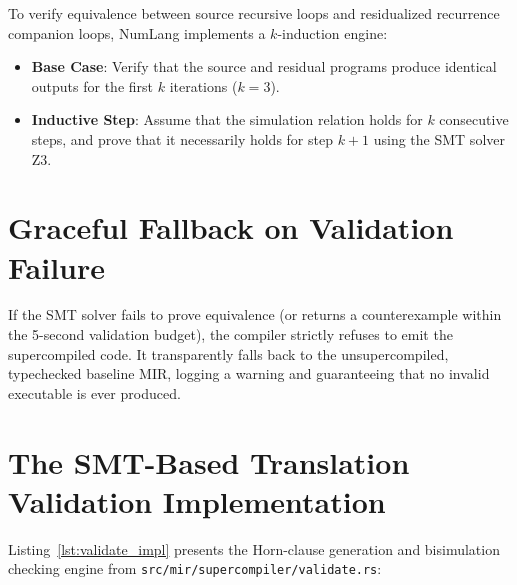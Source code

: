 To verify equivalence between source recursive loops and residualized recurrence companion loops, NumLang implements a $k$-induction engine:
\begin{itemize}
    \item \textbf{Base Case}: Verify that the source and residual programs produce identical outputs for the first $k$ iterations ($k = 3$).
    \item \textbf{Inductive Step}: Assume that the simulation relation holds for $k$ consecutive steps, and prove that it necessarily holds for step $k+1$ using the SMT solver Z3.
\end{itemize}

\section{Graceful Fallback on Validation Failure}
\label{sec:validation:fallback}

If the SMT solver fails to prove equivalence (or returns a counterexample within the 5-second validation budget), the compiler strictly refuses to emit the supercompiled code. It transparently falls back to the unsupercompiled, typechecked baseline MIR, logging a warning and guaranteeing that no invalid executable is ever produced.

\section{The SMT-Based Translation Validation Implementation}
\label{sec:validation:smt_impl}

Listing~\ref{lst:validate_impl} presents the Horn-clause generation and bisimulation checking engine from \texttt{src/mir/supercompiler/validate.rs}:

